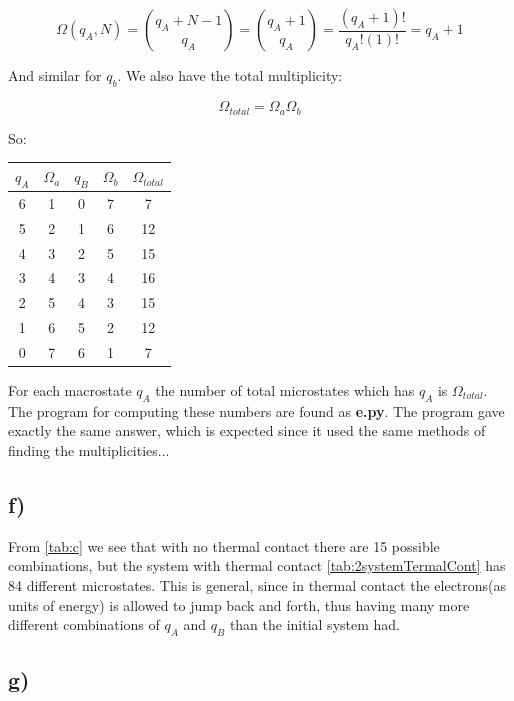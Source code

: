 \documentclass[a4paper,norsk, 10pt]{article}
\begin{document}
\begin{equation}
\Omega(q_A,N) = \binom{q_A + N -1}{q_A} = \binom{q_A + 1}{q_A} = \frac{(q_A + 1)!}{q_A!(1)!} = q_A + 1 
\end{equation}

And similar for $q_b$. We also have the total multiplicity:

\begin{equation}
\Omega_{total} = \Omega_a \Omega_b
\end{equation}

So:

\begin{table}[H]
\centering
\begin{tabular}{|c|c|c|c|c|}
\hline
$q_A$ & $\Omega_a$ & $q_B$ & $\Omega_b$ & $\Omega_{total}$ \\
\hline
6 & 1 & 0 & 7 & 7\\
5 & 2 & 1 & 6 & 12\\
4 & 3 & 2 & 5 & 15\\
3 & 4 & 3 & 4 & 16\\
2 & 5 & 4 & 3 & 15\\
1 & 6 & 5 & 2 & 12\\
0 & 7 & 6 & 1 & 7\\
\hline
\end{tabular}
\end{table} \label{tab:2systemTermalCont}

For each macrostate $q_A$ the number of total microstates which has $q_A$ is $\Omega_{total}$.\\

The program for computing these numbers are found as \textbf{e.py}. The program gave exactly the same answer, which is expected since it used the same methods of finding the multiplicities...

\subsection{f)}
From \ref{tab:c} we see that with no thermal contact there are 15 possible combinations, but the system with thermal contact \ref{tab:2systemTermalCont} has 84 different microstates. This is general, since in thermal contact the electrons(as units of energy) is allowed to jump back and forth, thus having many more different combinations of $q_A$ and $q_B$ than the initial system had.

\subsection{g)}
\end{document}
